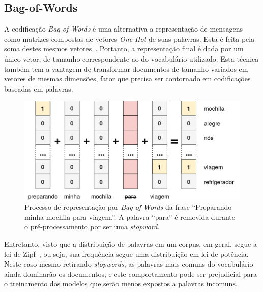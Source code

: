\subsection{Bag-of-Words}

A codificação \textit{Bag-of-Words} é uma alternativa a representação de
mensagens como matrizes compostas de vetores \textit{One-Hot} de suas palavras.
Esta é feita pela soma destes mesmos vetores~\cite{manning10}.
Portanto, a representação final é dada por um único vetor, de tamanho
correspondente ao do vocabulário utilizado.
Esta técnica também tem a vantagem de transformar documentos de tamanho variados
em vetores de mesmas dimensões, fator que precisa ser contornado em codificações
baseadas em palavras.

\begin{figure}[h]
\begin{center} {
    \begin{center}
    \includegraphics[scale=0.30]{images/bag_of_words.png}
    \caption{Processo de representação por \textit{Bag-of-Words} da frase
             ``Preparando minha mochila para viagem.''.
             A palavra ``para'' é removida durante o pré-processamento por
             ser uma \textit{stopword}.}
    \label{fig:bag_of_words}
    \end{center}
}
\end{center}
\end{figure}

Entretanto, visto que a distribuição de palavras em um corpus, em geral, segue a
lei de Zipf~\cite{powers98}, ou seja, sua frequência segue uma distribuição em
lei de potência.
Neste caso mesmo retirando \textit{stopwords}, as palavras mais comuns do
vocabulário ainda dominarão os documentos, e este comportamento pode ser
prejudicial para o treinamento dos modelos que serão menos expostos a palavras
incomuns.


